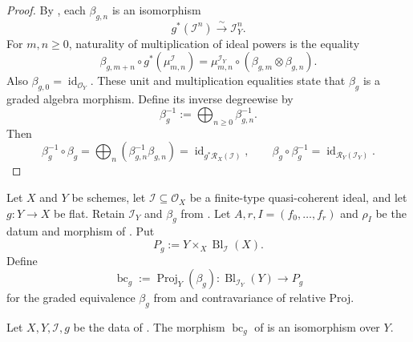 \begin{proof}
  By , each
  $\beta_{g,n}$ is an isomorphism
  \[
    g^*(\mathcal I^n)\xrightarrow{\sim}\mathcal I_Y^n.
  \]
  For $m,n\ge0$, naturality of multiplication of ideal powers is the
  equality
  \[
    \beta_{g,m+n}\circ g^*(\mu^{\mathcal I}_{m,n})
      =\mu^{\mathcal I_Y}_{m,n}\circ
        (\beta_{g,m}\otimes\beta_{g,n}).
  \]
  Also $\beta_{g,0}=\operatorname{id}_{\mathcal O_Y}$.  These unit and
  multiplication equalities state that $\beta_g$ is a graded algebra
  morphism.  Define its inverse degreewise by
  \[
    \beta_g^{-1}:=\bigoplus_{n\ge0}\beta_{g,n}^{-1}.
  \]
  Then
  \[
    \beta_g^{-1}\circ\beta_g
      =\bigoplus_n(\beta_{g,n}^{-1}\beta_{g,n})
      =\operatorname{id}_{g^*\mathcal R_X(\mathcal I)},
    \qquad
    \beta_g\circ\beta_g^{-1}
      =\operatorname{id}_{\mathcal R_Y(\mathcal I_Y)}.
  \]
\end{proof}

\begin{definition}
  \label{def:nagata-blowup-flat-base-change-map}

  Let $X$ and $Y$ be schemes, let
  $\mathcal I\subseteq\mathcal O_X$ be a finite-type quasi-coherent ideal,
  and let $g\colon Y\to X$ be flat.  Retain
  $\mathcal I_Y$ and $\beta_g$ from
  .  
  Let $A,r,I=(f_0,\ldots,f_r)$ and $\rho_I$ be the datum and morphism of
  .  Put
  \[
    P_g:=Y\times_X\operatorname{Bl}_{\mathcal I}(X).
  \]
  Define
  \[
    \operatorname{bc}_g:=\operatorname{Proj}_Y(\beta_g)\colon
    \operatorname{Bl}_{\mathcal I_Y}(Y)
      \longrightarrow
    P_g
  \]
  for the graded equivalence $\beta_g$ from
   and contravariance of relative
  Proj.
\end{definition}

\begin{theorem}
  \label{thm:nagata-blowup-flat-base-change}

  Let $X,Y,\mathcal I,g$ be the data of
  .  The morphism
  $\operatorname{bc}_g$ of
   is an isomorphism over
  $Y$.
\end{theorem}


